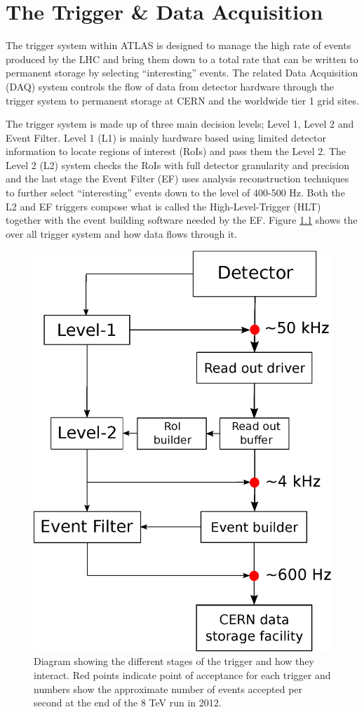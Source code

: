 \chapter{The Trigger \& Data Acquisition}

	The trigger system within ATLAS \cite{Aad:1129811} is designed to manage the high rate of events produced by the LHC and bring them down to a total rate that can be written to permanent storage by selecting ``interesting'' events. The related Data Acquisition (DAQ) system controls the flow of data from detector hardware through the trigger system to permanent storage at CERN and the worldwide tier 1 grid sites. 

	The trigger system is made up of three main decision levels; Level 1, Level 2 and Event Filter. Level 1 (L1) is mainly hardware based using limited detector information to locate regions of interest (RoIs) and pass them the Level 2. The Level 2 (L2) system checks the RoIs with full detector granularity and precision and the last stage the Event Filter (EF) uses analysis reconstruction techniques to further select ``interesting'' events down to the level of 400-500 Hz. Both the L2 and EF triggers compose what is called the High-Level-Trigger (HLT) together with the event building software needed by the EF. Figure \ref{fig:triggerFlow} shows the over all trigger system and how data flows through it.

	\begin{figure}[h]
        \begin{center}
            \includegraphics[width=0.7\linewidth]{images/Trigger_system.eps}
        \end{center}
        \caption{Diagram showing the different stages of the trigger and how they interact. Red points indicate point of acceptance for each trigger and numbers show the approximate number of events accepted per second at the end of the 8 TeV run in 2012.}
        \label{fig:triggerFlow}
    \end{figure}


